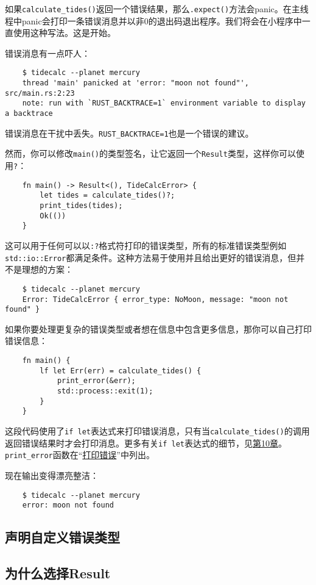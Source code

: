 如果\texttt{calculate\_tides()}返回一个错误结果，那么\texttt{.expect()}方法会panic。在主线程中panic会打印一条错误消息并以非0的退出码退出程序。我们将会在小程序中一直使用这种写法。这是开始。

错误消息有一点吓人：
\begin{verbatim}
    $ tidecalc --planet mercury
    thread 'main' panicked at 'error: "moon not found"', src/main.rs:2:23
    note: run with `RUST_BACKTRACE=1` environment variable to display a backtrace
\end{verbatim}
错误消息在干扰中丢失。\texttt{RUST\_BACKTRACE=1}也是一个错误的建议。

然而，你可以修改\texttt{main()}的类型签名，让它返回一个\texttt{Result}类型，这样你可以使用\texttt{?}：
\begin{verbatim}
    fn main() -> Result<(), TideCalcError> {
        let tides = calculate_tides()?;
        print_tides(tides);
        Ok(())
    }
\end{verbatim}

这可以用于任何可以以\texttt{{:?}}格式符打印的错误类型，所有的标准错误类型例如\texttt{std::io::Error}都满足条件。这种方法易于使用并且给出更好的错误消息，但并不是理想的方案：
\begin{verbatim}
    $ tidecalc --planet mercury
    Error: TideCalcError { error_type: NoMoon, message: "moon not found" }
\end{verbatim}

如果你要处理更复杂的错误类型或者想在信息中包含更多信息，那你可以自己打印错误信息：
\begin{verbatim}
    fn main() {
        lf let Err(err) = calculate_tides() {
            print_error(&err);
            std::process::exit(1);
        }
    }
\end{verbatim}

这段代码使用了\texttt{if let}表达式来打印错误消息，只有当\texttt{calculate\_tides()}的调用返回错误结果时才会打印消息。更多有关\texttt{if let}表达式的细节，见\hyperref[ch10]{第10章}。\texttt{print\_error}函数在“\hyperref[printerror]{打印错误}”中列出。

现在输出变得漂亮整洁：
\begin{verbatim}
    $ tidecalc --planet mercury
    error: moon not found
\end{verbatim}

\subsection{声明自定义错误类型}

\subsection{为什么选择Result}
